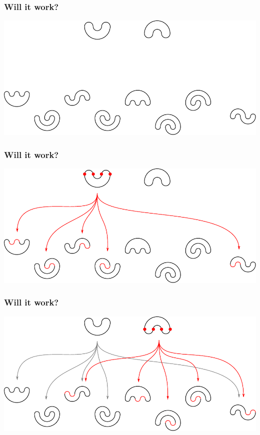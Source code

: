 \documentclass{beamer}
\begin{document}
\begin{frame}
\frametitle{Will it work?}
\begin{center}
\includegraphics[width=\textwidth]{meanders/2-into-3_1.pdf}
\end{center}
\end{frame}

\begin{frame}
\frametitle{Will it work?}
\begin{center}
\includegraphics[width=\textwidth]{meanders/2-into-3_2.pdf}
\end{center}
\end{frame}

\begin{frame}
\frametitle{Will it work?}
\begin{center}
\includegraphics[width=\textwidth]{meanders/2-into-3_3.pdf}
\end{center}
\end{frame}
\end{document}
